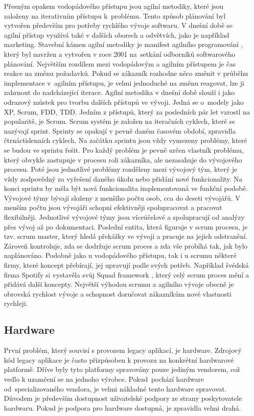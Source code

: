 Přesným opakem vodopádového přístupu jsou agilní metodiky, které jsou založeny na iterativním přístupu k problému. Tento způsob plánování byl vytvořen především pro potřeby rychlého vývoje softwaru. V dnešní době se agilní přístup využívá také v dalších oborech a odvětvích, jako je například marketing. Stavební kámen agilní metodiky je manifest agilního programování \cite{agilni_manifest}, který byl navržen a vytvořen v roce 2001 na setkání odborníků softwarového plánování. Největším rozdílem mezi vodopádovým a agilním přístupem je čas reakce na změnu požadavků. Pokud se zákazník rozhodne něco změnit v průběhu implementace v agilním přístupu, je velmi jednoduché na změnu reagovat, lze ji zahrnout do nadcházející iterace. Agilní metodika v dnešní době slouží i jako odrazový můstek pro tvorbu dalších přístupů ve vývoji. Jedná se o modely jako XP, Scrum, FDD, TDD. Jedním z přístupů, který za posledních pár let vzrostl na popularitě, je Scrum. Scrum systém je založen na iteračních cyklech, které se nazývají sprint. Sprinty se opakují v pevně daném časovém období, zpravidla čtrnáctidenních cyklech. Na začátku sprintu jsou vždy vymezeny problémy, které se budou ve sprintu řešit. Pro každý problém je pevně určen vlastník problému, který obvykle zastupuje v procesu roli zákazníka, ale nezasahuje do vývojového procesu. Poté jsou jednotlivé problémy rozděleny mezi vývojový tým, který je vždy zodpovědný za vyřešení daného úkolu nebo přidání nové funkcionality. Na konci sprintu by měla být nová funkcionalita implementovaná ve funkční podobě. Vývojové týmy bývají složeny z menšího počtu osob, cca do deseti vývojářů. V menším počtu jsou vývojáři schopni efektivněji spolupracovat a pracovat flexibilněji. Jednotlivé vývojové týmy jsou víceúčelové a spolupracují od analýzy přes vývoj až po dokumentaci. Poslední entita, která figuruje v scrum procesu, je tzv. scrum master, který hledá překážky ve vývoji a pracuje na jejich odstranění. Zároveň kontroluje, zda se dodržuje scrum proces a zda vše probíhá tak, jak bylo naplánováno. Podobně jako u vodopádového přístupu, tak i u scrumu některé firmy, které koncept přebírají, jej upravují podle svých potřeb. Například švédská firma Spotify si vystavěla svůj Squad framework \cite{squad_framework}, který celý scrum proces mění a přidává další koncepty. Největší výhodou scrumu a agilního vývoje obecně je obrovská rychlost vývoje a schopnost doručovat zákazníkům nové vlastnosti rychleji.

\subsection{Hardware}
První problém, který souvisí s provozem legacy aplikací, je hardware. Zdrojový kód legacy aplikace je často přizpůsoben k provozu na konkrétní hardwarové platformě. Dříve byly tyto platformy spravovány pouze jediným vendorem, což vedlo k uzamčení se na jednoho výrobce. Pokud pochází hardware od specializovaného vendora, je velmi nákladné tento hardware spravovat. Důvodem je především dostupnost uživatelské podpory ze strany poskytovatele hardwaru. Pokud je podpora pro hardware dostupná, je zpravidla velmi drahá.

